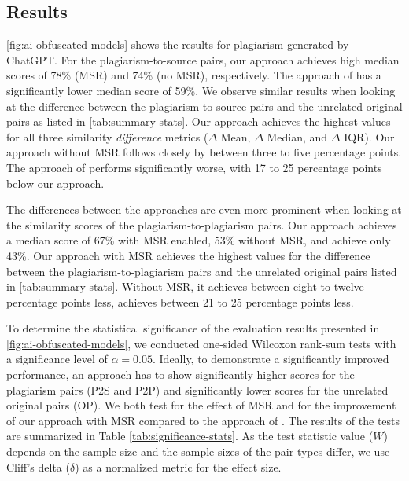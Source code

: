 \subsection{Results}

\noindent
\autoref{fig:ai-obfuscated-models} shows the results for plagiarism generated by ChatGPT.
For the plagiarism-to-source pairs, our approach achieves high median scores of 78\% (MSR) and 74\% (no MSR), respectively. The approach of \citet{Martinez2020} has a significantly lower median score of 59\%. We observe similar results when looking at the difference between the plagiarism-to-source pairs and the unrelated original pairs as listed in \autoref{tab:summary-stats}. Our approach achieves the highest values for all three similarity \textit{difference} metrics ($\Delta$ Mean, $\Delta$ Median, and $\Delta$ IQR). Our approach without MSR follows closely by between three to five percentage points. The approach of \citet{Martinez2020} performs significantly worse, with 17 to 25 percentage points below our approach.

The differences between the approaches are even more prominent when looking at the similarity scores of the plagiarism-to-plagiarism pairs.
Our approach achieves a median score of 67\% with MSR enabled, 53\% without MSR, and \citet{Martinez2020} achieve only 43\%.
Our approach with MSR achieves the highest values for the difference between the plagiarism-to-plagiarism pairs and the unrelated original pairs listed in \autoref{tab:summary-stats}.
Without MSR, it achieves between eight to twelve percentage points less, \citet{Martinez2020} achieves between 21 to 25 percentage points less.

To determine the statistical significance of the evaluation results presented in \autoref{fig:ai-obfuscated-models}, we conducted one-sided Wilcoxon rank-sum tests with a significance level of $\alpha=0.05$. Ideally, to demonstrate a significantly improved performance, an approach has to show significantly higher scores for the plagiarism pairs (P2S and P2P) and significantly lower scores for the unrelated original pairs (OP). We both test for the effect of MSR and for the improvement of our approach with MSR compared to the approach of \citet{Martinez2020}. The results of the tests are summarized in Table \ref{tab:significance-stats}.
As the test statistic value ($W$) depends on the sample size and the sample sizes of the pair types differ, we use Cliff's delta ($\delta$) as a normalized metric for the effect size.

